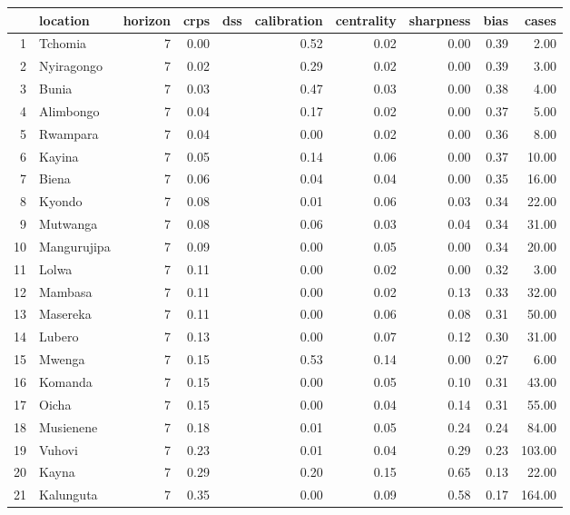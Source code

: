 \begin{table}[ht]
\centering
\begin{tabular}{rlrrrrrrrr}
  \hline
 & location & horizon & crps & dss & calibration & centrality & sharpness & bias & cases \\ 
  \hline
1 & Tchomia &   7 & 0.00 &  & 0.52 & 0.02 & 0.00 & 0.39 & 2.00 \\ 
  2 & Nyiragongo &   7 & 0.02 &  & 0.29 & 0.02 & 0.00 & 0.39 & 3.00 \\ 
  3 & Bunia &   7 & 0.03 &  & 0.47 & 0.03 & 0.00 & 0.38 & 4.00 \\ 
  4 & Alimbongo &   7 & 0.04 &  & 0.17 & 0.02 & 0.00 & 0.37 & 5.00 \\ 
  5 & Rwampara &   7 & 0.04 &  & 0.00 & 0.02 & 0.00 & 0.36 & 8.00 \\ 
  6 & Kayina &   7 & 0.05 &  & 0.14 & 0.06 & 0.00 & 0.37 & 10.00 \\ 
  7 & Biena &   7 & 0.06 &  & 0.04 & 0.04 & 0.00 & 0.35 & 16.00 \\ 
  8 & Kyondo &   7 & 0.08 &  & 0.01 & 0.06 & 0.03 & 0.34 & 22.00 \\ 
  9 & Mutwanga &   7 & 0.08 &  & 0.06 & 0.03 & 0.04 & 0.34 & 31.00 \\ 
  10 & Mangurujipa &   7 & 0.09 &  & 0.00 & 0.05 & 0.00 & 0.34 & 20.00 \\ 
  11 & Lolwa &   7 & 0.11 &  & 0.00 & 0.02 & 0.00 & 0.32 & 3.00 \\ 
  12 & Mambasa &   7 & 0.11 &  & 0.00 & 0.02 & 0.13 & 0.33 & 32.00 \\ 
  13 & Masereka &   7 & 0.11 &  & 0.00 & 0.06 & 0.08 & 0.31 & 50.00 \\ 
  14 & Lubero &   7 & 0.13 &  & 0.00 & 0.07 & 0.12 & 0.30 & 31.00 \\ 
  15 & Mwenga &   7 & 0.15 &  & 0.53 & 0.14 & 0.00 & 0.27 & 6.00 \\ 
  16 & Komanda &   7 & 0.15 &  & 0.00 & 0.05 & 0.10 & 0.31 & 43.00 \\ 
  17 & Oicha &   7 & 0.15 &  & 0.00 & 0.04 & 0.14 & 0.31 & 55.00 \\ 
  18 & Musienene &   7 & 0.18 &  & 0.01 & 0.05 & 0.24 & 0.24 & 84.00 \\ 
  19 & Vuhovi &   7 & 0.23 &  & 0.01 & 0.04 & 0.29 & 0.23 & 103.00 \\ 
  20 & Kayna &   7 & 0.29 &  & 0.20 & 0.15 & 0.65 & 0.13 & 22.00 \\ 
  21 & Kalunguta &   7 & 0.35 &  & 0.00 & 0.09 & 0.58 & 0.17 & 164.00 \\ 

\end{tabular}
\end{table}
